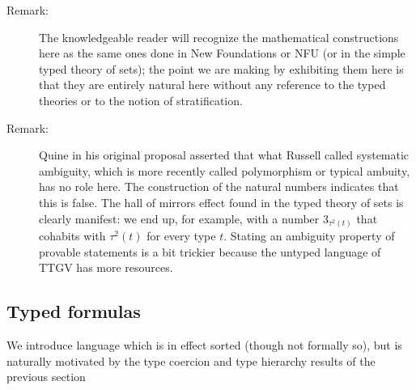 \documentclass[12pt]{article}
\begin{document}
\begin{description}
\item[Remark:]  The knowledgeable reader will recognize the mathematical constructions here as the same ones done in New Foundations or NFU (or in the simple typed theory of sets);  the point we are making by exhibiting them here is that they are entirely natural here without any reference to the typed theories or to the notion of stratification.

\item[Remark:]  Quine in his original proposal asserted that what Russell called systematic ambiguity, which is more recently called polymorphism or typical ambuity, has no role here.  The construction of the natural numbers indicates that this is false.  The hall of mirrors effect found in the typed theory of sets
is clearly manifest:  we end up, for example, with a number $3_{\tau^2(t)}$ that cohabits with $\tau^2(t)$ for every type $t$.  Stating an ambiguity property of provable statements is a bit trickier because the untyped language of TTGV has more resources.

\end{description}

\subsection{Typed formulas}

We introduce language which is in effect sorted (though not formally so), but is naturally motivated by the type coercion and type hierarchy results of the previous section
\end{document}
